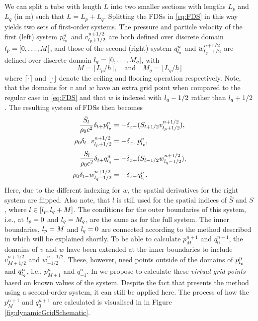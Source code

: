 We can split a tube with length $L$ into two smaller sections with lengths $L_p$ and $L_q$ (in m) such that $L = L_p + L_q$. Splitting the FDSs in \eqref{eq:FDS} in this way yields two sets of first-order systems. The pressure and particle velocity of the first (left) system $p_{l_p}^n$ and $v_{{l_p}+1/2}^{n+1/2}$ are both defined over discrete domain ${l_p} = [0, \hdots, M]$, and those of the second (right) system $q_{l_q}^n$ and $w_{{l_q}-1/2}^{n+1/2}$ are defined over discrete domain ${l_q} = [0, \hdots, M_q]$, with
\begin{equation}\label{eq:MMq}
    M = \lceil L_p/h\rceil, \quad \text{and} \quad M_q = \lfloor L_q/h\rfloor
\end{equation} where $\lceil \cdot \rceil$ and $\lfloor \cdot \rfloor$ denote the ceiling and flooring operation respectively. Note, that the domains for $v$ and $w$ have an extra grid point when compared to the regular case in \eqref{eq:FDS} and that $w$ is indexed with ${l_q}-1/2$ rather than ${l_q}+1/2$. The resulting system of FDSs then becomes
\begin{subequations}\label{eq:firstOrderPairs}
    \begin{align}
        \frac{\bar S_{l}}{\rho_0 c^2}\delta_{t+}p_{l_p}^n &= -\delta_{x-}(S_{{l}+1/2}v_{{l_p}+1/2}^{n+1/2}),\label{eq:discPressureP}\\
        \rho_0 \delta_{t-}v_{{l_p}+1/2}^{n+1/2}&=-\delta_{x+}p_{l_p}^n,\label{eq:discVelocityV}\\
        \frac{\bar S_{l}}{\rho_0 c^2}\delta_{t+}q_{l_q}^n &= -\delta_{x+}(S_{{l}-1/2}w_{{l_q}-1/2}^{n+1/2}),\label{eq:discPressureQ}\\
        \rho_0 \delta_{t-}w_{{l_q}-1/2}^{n+1/2}&=-\delta_{x-}q_{l_q}^n.\label{eq:discVelocityW}
    \end{align}
\end{subequations}
Here, due to the different indexing for $w$, the spatial derivatives for the right system are flipped. Also note, that $l$ is still used for the spatial indices of $\bar S$ and $S$, where $l\in {[}{l_p}, {l_q}+M{]}$. The conditions for the outer boundaries of this system, i.e., at ${l_p} = 0$ and ${l_q} = M_q$, are the same as for the full system. The inner boundaries, ${l_p} = M$ and ${l_q} = 0$ are connected according to the method described in \cite{Willemsen2021} which will be explained shortly.
To be able to calculate $p_M^{n+1}$ and $q_0^{n+1}$, the domains of $v$ and $w$ have been extended at the inner boundaries to include $v_{M+1/2}^{n+1/2}$ and $w_{-1/2}^{n+1/2}$. These, however, need points outside of the domains of $p_{l_p}^n$ and $q_{l_q}^n$, i.e., $p_{M+1}^n$ and $q_{-1}^n$. In \cite{Willemsen2021} we propose to calculate these \textit{virtual grid points} based on known values of the system. Despite the fact that \cite{Willemsen2021} presents the method using a second-order system, it can still be applied here. The process of how the $p_M^{n+1}$ and $q_0^{n+1}$ are calculated is visualised in in Figure \ref{fig:dynamicGridSchematic}.

